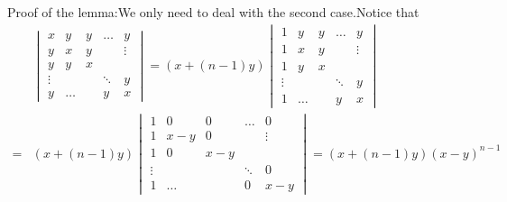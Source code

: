 \documentclass[a4paper,12pt]{article}
\newenvironment{prooff}{{\noindent\it\textcolor{cyan!40!black}{Proof}:}\quad}{\par}
\begin{document}
\begin{prooff}
    Proof of the lemma:We only need to deal with the second case.Notice that
    \begin{align*}
          & \begin{vmatrix}
            x      & y     & y & \dots  & y      \\
            y      & x     & y &        & \vdots \\
            y      & y     & x &        &        \\
            \vdots &       &   & \ddots & y      \\
            y      & \dots &   & y      & x
        \end{vmatrix}  =(x+(n-1)y)\begin{vmatrix}
            1      & y     & y & \dots  & y      \\
            1      & x     & y &        & \vdots \\
            1      & y     & x &        &        \\
            \vdots &       &   & \ddots & y      \\
            1      & \dots &   & y      & x
        \end{vmatrix} \\
        = & (x+(n-1)y)\begin{vmatrix}
            1      & 0     & 0   & \dots  & 0      \\
            1      & x-y   & 0   &        & \vdots \\
            1      & 0     & x-y &        &        \\
            \vdots &       &     & \ddots & 0      \\
            1      & \dots &     & 0      & x-y
        \end{vmatrix}
        =(x+(n-1)y)(x-y)^{n-1}
    \end{align*}


\end{prooff}
\end{document}

